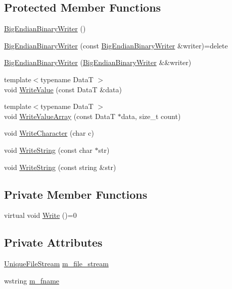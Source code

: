 \subsection*{Protected Member Functions}
\begin{DoxyCompactItemize}
\item 
\hyperlink{classmage_1_1_big_endian_binary_writer_ac0917b684913834577d4850269a6c09a}{Big\+Endian\+Binary\+Writer} ()
\item 
\hyperlink{classmage_1_1_big_endian_binary_writer_aafe65752342b2740e7293878ae469d9f}{Big\+Endian\+Binary\+Writer} (const \hyperlink{classmage_1_1_big_endian_binary_writer}{Big\+Endian\+Binary\+Writer} \&writer)=delete
\item 
\hyperlink{classmage_1_1_big_endian_binary_writer_a9b20aeebc41030d173cb44067665adb0}{Big\+Endian\+Binary\+Writer} (\hyperlink{classmage_1_1_big_endian_binary_writer}{Big\+Endian\+Binary\+Writer} \&\&writer)
\item 
{\footnotesize template$<$typename DataT $>$ }\\void \hyperlink{classmage_1_1_big_endian_binary_writer_a30edcc0ad823fc8b4f8c51107f11405a}{Write\+Value} (const DataT \&data)
\item 
{\footnotesize template$<$typename DataT $>$ }\\void \hyperlink{classmage_1_1_big_endian_binary_writer_a70459f96b5389052d6e090e124c5468b}{Write\+Value\+Array} (const DataT $\ast$data, size\+\_\+t count)
\item 
void \hyperlink{classmage_1_1_big_endian_binary_writer_a869eff3f6e0666406bd5470af3e02096}{Write\+Character} (char c)
\item 
void \hyperlink{classmage_1_1_big_endian_binary_writer_a1a62be10de26eb77e1812e6807eb4c02}{Write\+String} (const char $\ast$str)
\item 
void \hyperlink{classmage_1_1_big_endian_binary_writer_a0cbee156086deb8999e609a2b355ff0e}{Write\+String} (const string \&str)
\end{DoxyCompactItemize}
\subsection*{Private Member Functions}
\begin{DoxyCompactItemize}
\item 
virtual void \hyperlink{classmage_1_1_big_endian_binary_writer_ae6ee6613e629971502324cffc944795d}{Write} ()=0
\end{DoxyCompactItemize}
\subsection*{Private Attributes}
\begin{DoxyCompactItemize}
\item 
\hyperlink{namespacemage_a4250d57cb76846bd81137e496ca41148}{Unique\+File\+Stream} \hyperlink{classmage_1_1_big_endian_binary_writer_ad2cdbdca429d6c351a57b51d175ffb55}{m\+\_\+file\+\_\+stream}
\item 
wstring \hyperlink{classmage_1_1_big_endian_binary_writer_a5bf83b685bfce080f55458bdca2e698a}{m\+\_\+fname}
\end{DoxyCompactItemize}


